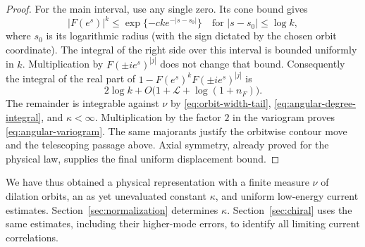 \begin{proof}
For the main interval, use any single zero.  Its cone bound gives
\[
 |F(e^s)|^k\le
 \exp\{-c k e^{-|s-s_0|}\}
 \quad\text{for } |s-s_0|\le\log k,
\]
where $s_0$ is its logarithmic radius (with the sign dictated by the
chosen orbit coordinate).  The integral of the right side over this
interval is bounded uniformly in $k$.  Multiplication by
$F(\pm i e^s)^{|j|}$ does not change that bound.  Consequently the
integral of the real part of $1-F(e^s)^kF(\pm i e^s)^{|j|}$ is
\[
 2\log k+O\bigl(1+\mathcal L+\log(1+n_F)\bigr).
\]
The remainder is integrable against $\nu$ by
\eqref{eq:orbit-width-tail}, \eqref{eq:angular-degree-integral}, and
$\kappa<\infty$.  Multiplication by the factor $2$ in the variogram
proves \eqref{eq:angular-variogram}.  The same majorants justify the
orbitwise contour move and the telescoping passage above.  Axial
symmetry, already proved for the physical law, supplies the final
uniform displacement bound.
\end{proof}

We have thus obtained a physical representation with a finite measure
$\nu$ of dilation orbits, an as yet unevaluated constant $\kappa$, and
uniform low-energy current estimates.  Section~\ref{sec:normalization}
determines $\kappa$.  Section~\ref{sec:chiral} uses the same estimates,
including their higher-mode errors, to identify all limiting current
correlations.
